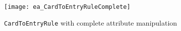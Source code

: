 \newpage

\vspace*{3cm}

\begin{figure}[htbp]
\hspace{-2cm}
  \texttt{[image: ea\_CardToEntryRuleComplete]}
  \caption{\texttt{CardToEntryRule} with complete attribute manipulation}
  \label{ea:cardtoentry_complete}
\end{figure}

